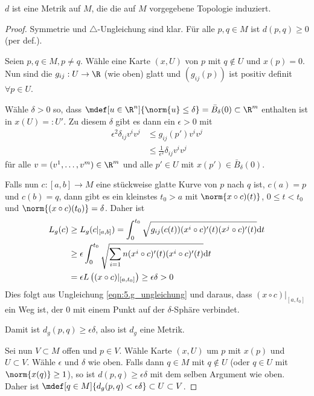 \begin{stz}
  $d$ ist eine Metrik auf $M$, die die auf $M$ vorgegebene Topologie induziert.
  \begin{proof}
    Symmetrie und $\triangle$-Ungleichung sind klar. Für alle $p,q \in M$ ist
    $d(p,q)\geq 0$ (per def.).

    Seien $p,q\in M, p\neq q$. Wähle eine Karte $(x, U)$ von $p$ mit $q\notin U$
    und $x(p) = 0$. Nun sind die $g_{ij} : U \to \R$ (wie oben) glatt und
    $\left( g_{ij}(p) \right)$ ist positiv definit $\forall p\in U$.

    Wähle $\delta > 0$ so, dass $\mdef[u\in \R^n]{\norm{u} \leq \delta} = \bar
    B_\delta (0) \subset \R^m$ enthalten ist in $x(U) =: U'$. Zu diesem $\delta$
    gibt es dann ein $\epsilon > 0$ mit
    \begin{align}
      \epsilon^2 \delta_{ij}v^iv^j &\leq g_{ij}(p')v^iv^j \\
      &\leq \frac{1}{\epsilon^2} \delta_{ij}v^iv^j
      \label{eqn:5.g_ungleichung}
    \end{align}
    für alle $v = (v^1,\dots,v^m)\in \R^m$ und alle $p'\in U$ mit $x(p')\in \bar
    B_\delta (0)$.

    Falls nun $c : [a, b] \to M$ eine stückweise glatte Kurve von $p$ nach $q$
    ist, $c(a) = p$ und $c(b) = q$, dann gibt es ein kleinstes $t_0 > a$ mit
    $\norm{x\circ c)(t)}$, $0 \leq t < t_0$ und $\norm{(x\circ c)(t_0)} =
    \delta$. Daher ist
    \begin{align}
      L_g(c) &\ge L_g(c\vert_{[a,b]}) = \int_0^{t_0} \sqrt{g_{ij}(c(t))(x^i\circ
      c)'(t)(x^j\circ c)'(t)}\mathrm d t \\
             &\ge \epsilon \int_0^{t_0}
             \sqrt{\sum_{i=1}{n}(x^i\circ c)'(t)(x^i\circ c)'(t)}\mathrm d t \\ &= \epsilon
             L\left( (x\circ c)\vert_{[a,t_0]} \right) \ge \epsilon\delta > 0
             \label{eqn:5.lg_ungleichung}
    \end{align}
    Dies folgt aus Ungleichung \ref{eqn:5.g_ungleichung} und daraus, dass
    $(x\circ c)\vert_{[a,t_0]}$ ein Weg ist, der $0$ mit einem Punkt auf der
    $\delta$-Sphäre verbindet.

    Damit ist $d_g(p,q) \ge \epsilon\delta$, also ist $d_g$ eine Metrik.


    Sei nun $V \subset M$ offen und $p\in V$. Wähle Karte $(x, U)$ um $p$ mit
    $x(p)$ und $U \subset V$. Wähle $\epsilon$ und $\delta$ wie oben. Falls dann
    $q\in M$ mit $q\notin U$ (oder $q\in U$ mit $\norm{x(q)}\ge 1$), so ist
    $d(p,q) \ge \epsilon\delta$ mit dem selben Argument wie oben. Daher ist
    $\mdef[q\in M]{d_g(p,q)<\epsilon\delta}\subset U \subset V$.


\end{proof}
\end{stz}
